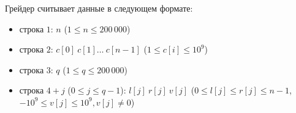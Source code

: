Грейдер считывает данные в следующем формате:
\begin{itemize}
\item строка $1$: $n$ ($1 \leq n \leq 200\,000$)
\item строка $2$: $c[0]\ c[1]\ldots \ c[n-1]$ ($1 \leq c[i] \leq 10^9$)
\item строка $3$: $q$ ($1 \leq q \leq 200\,000$)
\item строка $4+j$ ($0\leq j \leq q-1$): $l[j]\ r[j]\ v[j]$ ($0 \leq l[j] \leq r[j] \leq n-1$, $-10^9\leq v[j] \leq 10^9, v[j] \neq 0$)
\end{itemize}